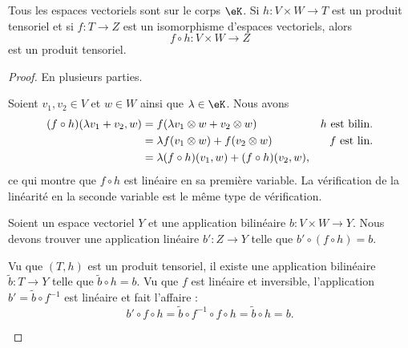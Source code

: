 \begin{proposition}			\label{PROPooMMOPooEkqkpk}
	Tous les espaces vectoriels sont sur le corps \( \eK\). Si \(h \colon V\times W\to T  \) est un produit tensoriel et si \(f \colon T\to Z  \) est un isomorphisme d'espaces vectoriels, alors
	\begin{equation}
		f\circ h \colon V\times W\to Z
	\end{equation}
	est un produit tensoriel.
\end{proposition}

\begin{proof}
	En plusieurs parties.
	\begin{subproof}
		Soient \( v_1, v_2\in V\) et \( w\in W\) ainsi que \( \lambda\in \eK\). Nous avons
		\begin{subequations}
			\begin{align}
				(f\circ h)(\lambda v_1+v_2,w) & = f(\lambda v_1\otimes w+v_2\otimes w)       & \text{\( h\) est bilin.} \\
				                              & =\lambda f(v_1\otimes w)+f(v_2\otimes w)     & \text{\( f\) est lin.}   \\
				                              & =\lambda(f\circ h)(v_1,w)+(f\circ h)(v_2,w),
			\end{align}
		\end{subequations}
		ce qui montre que \( f\circ h\) est linéaire en sa première variable. La vérification de la linéarité en la seconde variable est le même type de vérification.

		Soient un espace vectoriel \( Y\) et une application bilinéaire \(b \colon V\times W\to Y  \). Nous devons trouver une application linéaire \(b' \colon Z\to Y  \) telle que \( b'\circ(f\circ h)=b\).

		Vu que \( (T,h)\) est un produit tensoriel, il existe une application bilinéaire \(\tilde b \colon T\to Y  \) telle que \( \tilde b\circ h=b\). Vu que \( f\) est linéaire et inversible, l'application \( b'=\tilde b\circ f^{-1}\) est linéaire et fait l'affaire :
		\begin{equation}
			b'\circ f\circ h=\tilde b\circ f^{-1}\circ f\circ h=\tilde b\circ h=b.
		\end{equation}
	\end{subproof}
\end{proof}


